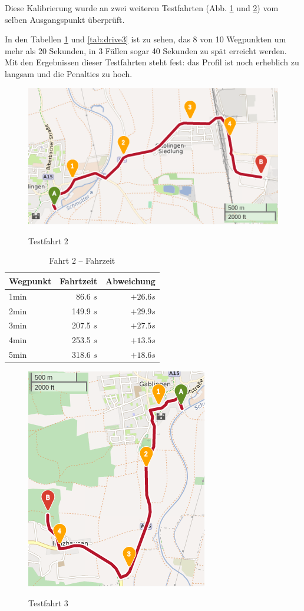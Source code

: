 Diese Kalibrierung wurde an zwei weiteren Testfahrten (Abb. \ref{fig:drive2} und \ref{fig:drive3}) vom selben Ausgangspunkt überprüft.

In den Tabellen \ref{tab:drive2} und \ref{tab:drive3} ist zu sehen, das 8 von 10 Wegpunkten um mehr als 20 Sekunden, in 3 Fällen sogar 40 Sekunden zu spät erreicht werden.
Mit den Ergebnissen dieser Testfahrten steht fest: das Profil ist noch erheblich zu langsam und die Penalties zu hoch.

\begin{figure}[h]
\centering
\caption{Testfahrt 2}
\label{fig:drive2}
\includegraphics[width = 0.70 \textwidth]{../media/Fahrt2crop.png} \\
\end{figure}

\begin{table}[]
\centering
\caption{Fahrt 2 -- Fahrzeit}
\label{tab:drive2}
\begin{tabular}{|l|r|r|}
\hline
Wegpunkt & Fahrtzeit & Abweichung \\ \hline 
1min & 86.6 $s$ & $+26.6 s$ \\
2min & 149.9 $s$ & $+29.9 s$ \\
3min & 207.5 $s$ & $+27.5 s$ \\
4min & 253.5 $s$ & $+13.5 s$ \\
5min & 318.6 $s$ & $+18.6 s$ \\
\hline
\end{tabular}
\end{table}


\begin{figure}[h]
\centering
\caption{Testfahrt 3}
\label{fig:drive3}
\includegraphics[width = 0.40 \textwidth]{../media/Fahrt3crop.png} \\
\end{figure}

